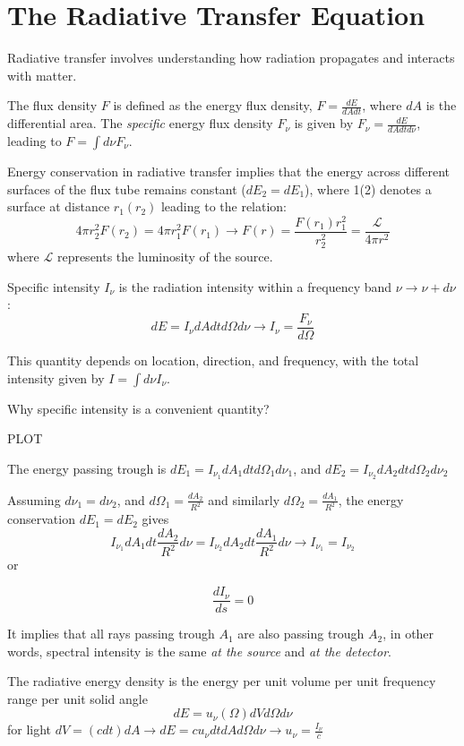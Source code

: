 \section{The Radiative Transfer Equation}

Radiative transfer involves understanding how radiation propagates and interacts with matter. 

The flux density \( F \) is defined as the energy flux density, \( F = \frac{dE}{dA dt} \), where \( dA \) is the differential area. The \emph{specific} energy flux density \( F_\nu \) is given by \( F_\nu = \frac{dE}{dA dt d\nu} \), leading to \( F = \int d\nu F_\nu \).

Energy conservation in radiative transfer implies that the energy across different surfaces of the flux tube remains constant (\( dE_2 = dE_1 \)), where 1(2) denotes a surface at distance $r_1(r_2)$ leading to the relation:
%
\[
4 \pi r_2^2 F(r_2) = 4 \pi r_1^2 F(r_1) \rightarrow F(r) = \frac{F(r_1) r_1^2}{r_2^2} = \frac{\mathcal L}{4\pi r^2} 
\]
%
where \( \mathcal L \) represents the luminosity of the source.

Specific intensity \( I_\nu \) is the radiation intensity within a frequency band \( \nu \rightarrow \nu + d\nu \):
%
\[
dE = I_\nu dA dt d\Omega d\nu \rightarrow I_\nu = \frac{F_\nu}{d\Omega}
\]

This quantity depends on location, direction, and frequency, with the total intensity given by \( I = \int d\nu I_\nu \).

Why specific intensity is a convenient quantity? 

PLOT

The energy passing trough is $dE_1 = I_{\nu_1} dA_1 dt d\Omega_1 d\nu_1$, and $dE_2 = I_{\nu_2} dA_2 dt d\Omega_2 d\nu_2$

Assuming $d\nu_1 = d\nu_2$, and $d\Omega_{1} = \frac{dA_2}{R^2}$ and similarly $d\Omega_2 = \frac{dA_1}{R^2}$, the energy conservation $dE_1 = dE_2$ gives
%
\[
I_{\nu_1} dA_1 dt \frac{dA_2}{R^2} d\nu = I_{\nu_2} dA_2 dt \frac{dA_1}{R^2} d\nu \rightarrow I_{\nu_1} = I_{\nu_2}
\]
%
or 
%
\begin{remark}
\[
\frac{dI_\nu}{ds} = 0
\]
\end{remark}

It implies that all rays passing trough $A_1$ are also passing trough $A_2$, in other words, spectral intensity is the same \emph{at the source} and \emph{at the detector}.

The radiative energy density is the energy per unit volume per unit frequency range per unit solid angle
%
\[
dE = u_\nu(\Omega) dV d\Omega d\nu
\]
%
for light $dV = (c dt) dA \rightarrow dE = c u_\nu dt dA d\Omega d\nu \rightarrow u_\nu = \frac{I_\nu}{c}$

